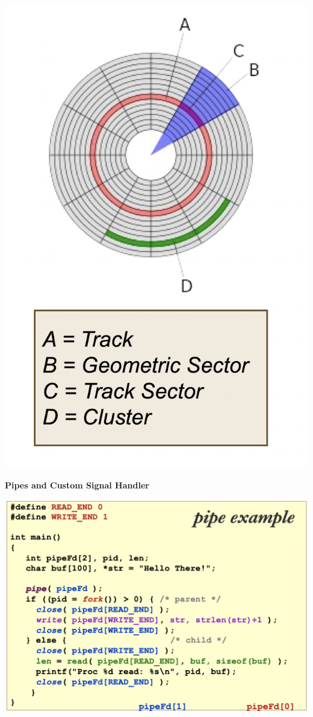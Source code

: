 \documentclass[10pt, a4paper]{article}
\begin{document}
\begin{multicols*}{3}
		\includegraphics*[scale=0.25]{./assets/harddisk}

		\textbf{Pipes and Custom Signal Handler}
		
		\includegraphics[scale=.37]{./assets/pipe.png}


\end{multicols*}
\end{document}
